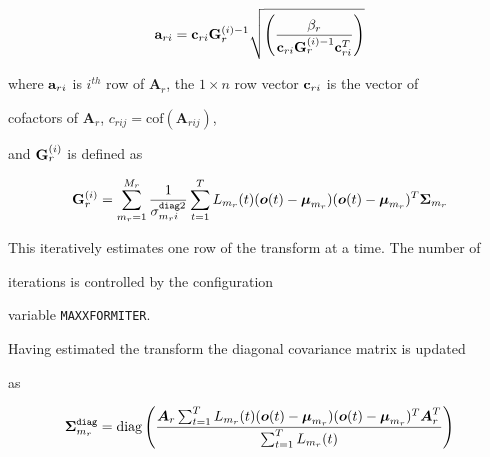 \begin{eqnarray}


{\bf a}_{ri} ={\bf c}_{ri}{\bf G}^{(i)-1}_r


\sqrt{\left(\frac{\beta_r}{{\bf


c}_{ri}{\bf G}_r^{(i)-1}{\bf c}^T_{ri}}\right)}


\end{eqnarray}


where ${\bf a}_{ri}$ is $i^{th}$ row of ${\bm


A}_r$, the $1\times n$ row vector ${\bf c}_{ri}$ is the vector of


cofactors of ${\bm A}_r$, $c_{rij}={\mbox{cof}}({\bm A}_{rij})$,


and  ${\bf G}^{(i)}_r$ is defined as


\begin{eqnarray}


{\bf G}^{(i)}_r=\sum_{m_r=1}^{M_r}


\frac{1}{\sigma_{m_ri}^{{\tt diag}2}}


\sum_{t=1}^TL_{m_r}(t)(\bm{o}(t)-{\bm{\mu}}_{m_r})


(\bm{o}(t)-{\bm{\mu}}_{m_r})^T


{\bm\Sigma}_{m_r}


\label{eq:gi_st}


\end{eqnarray}


This iteratively estimates one row of the transform at a time.  The number of 


iterations is controlled by the  configuration 


variable {\tt MAXXFORMITER}.





Having estimated the transform the diagonal covariance matrix is updated


as


\begin{eqnarray}


\bm{\Sigma}^{\tt diag}_{m_r} = {\mbox{diag}}\left(\frac{


{\bm A}_r\sum_{t=1}^TL_{m_r}(t)(\bm{o}(t)-{\bm{\mu}}_{m_r})


(\bm{o}(t)-{\bm{\mu}}_{m_r})^T{\bm A}_r^T}


{\sum_{t=1}^TL_{m_r}(t)}


\right)


\end{eqnarray}


